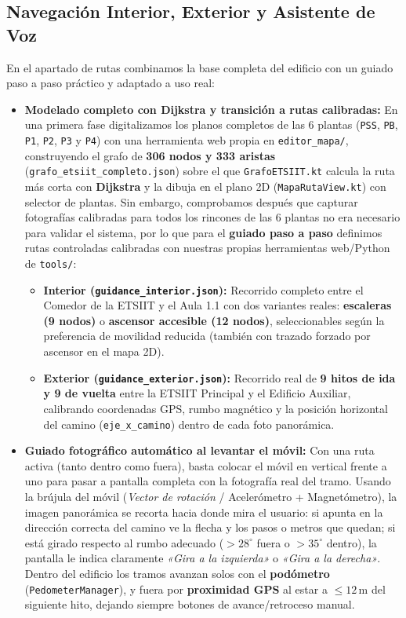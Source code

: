 \documentclass[11pt,a4paper]{article}
\begin{document}
\subsection{Navegación Interior, Exterior y Asistente de Voz}
En el apartado de rutas combinamos la base completa del edificio con un guiado paso a paso práctico y adaptado a uso real:
\begin{itemize}[leftmargin=1.8em]
    \item \textbf{Modelado completo con Dijkstra y transición a rutas calibradas:} En una primera fase digitalizamos los planos completos de las 6 plantas (\texttt{PSS}, \texttt{PB}, \texttt{P1}, \texttt{P2}, \texttt{P3} y \texttt{P4}) con una herramienta web propia en \texttt{editor\_mapa/}, construyendo el grafo de \textbf{306 nodos y 333 aristas} (\texttt{grafo\_etsiit\_completo.json}) sobre el que \texttt{GrafoETSIIT.kt} calcula la ruta más corta con \textbf{Dijkstra} y la dibuja en el plano 2D (\texttt{MapaRutaView.kt}) con selector de plantas. Sin embargo, comprobamos después que capturar fotografías calibradas para todos los rincones de las 6 plantas no era necesario para validar el sistema, por lo que para el \textbf{guiado paso a paso} definimos rutas controladas calibradas con nuestras propias herramientas web/Python de \texttt{tools/}:
    \begin{itemize}
        \item \textbf{Interior (\texttt{guidance\_interior.json}):} Recorrido completo entre el Comedor de la ETSIIT y el Aula 1.1 con dos variantes reales: \textbf{escaleras (9 nodos)} o \textbf{ascensor accesible (12 nodos)}, seleccionables según la preferencia de movilidad reducida (también con trazado forzado por ascensor en el mapa 2D).
        \item \textbf{Exterior (\texttt{guidance\_exterior.json}):} Recorrido real de \textbf{9 hitos de ida y 9 de vuelta} entre la ETSIIT Principal y el Edificio Auxiliar, calibrando coordenadas GPS, rumbo magnético y la posición horizontal del camino (\texttt{eje\_x\_camino}) dentro de cada foto panorámica.
    \end{itemize}
    \clearpage
    \item \textbf{Guiado fotográfico automático al levantar el móvil:} Con una ruta activa (tanto dentro como fuera), basta colocar el móvil en vertical frente a uno para pasar a pantalla completa con la fotografía real del tramo. Usando la brújula del móvil (\textit{Vector de rotación} / Acelerómetro + Magnetómetro), la imagen panorámica se recorta hacia donde mira el usuario: si apunta en la dirección correcta del camino ve la flecha y los pasos o metros que quedan; si está girado respecto al rumbo adecuado ($> 28^\circ$ fuera o $> 35^\circ$ dentro), la pantalla le indica claramente \textit{«Gira a la izquierda»} o \textit{«Gira a la derecha»}. Dentro del edificio los tramos avanzan solos con el \textbf{podómetro} (\texttt{PedometerManager}), y fuera por \textbf{proximidad GPS} al estar a $\le 12$\,m del siguiente hito, dejando siempre botones de avance/retroceso manual.

\end{itemize}
\end{document}
